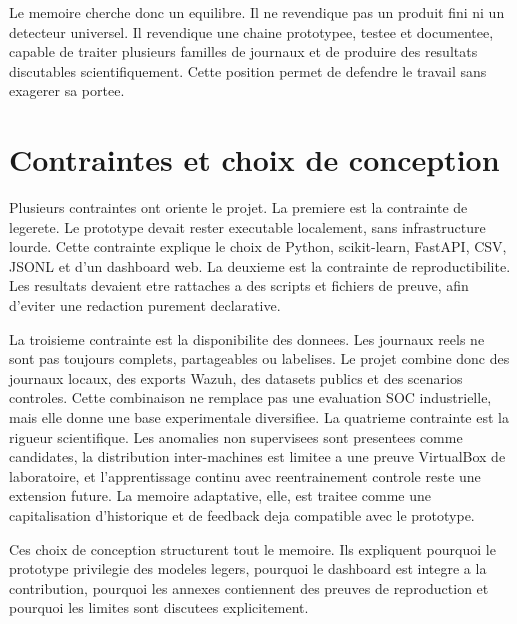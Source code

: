 Le memoire cherche donc un equilibre. Il ne revendique pas un produit fini ni un detecteur universel. Il revendique une chaine prototypee, testee et documentee, capable de traiter plusieurs familles de journaux et de produire des resultats discutables scientifiquement. Cette position permet de defendre le travail sans exagerer sa portee.

\section{Contraintes et choix de conception}
Plusieurs contraintes ont oriente le projet. La premiere est la contrainte de legerete. Le prototype devait rester executable localement, sans infrastructure lourde. Cette contrainte explique le choix de Python, scikit-learn, FastAPI, CSV, JSONL et d'un dashboard web. La deuxieme est la contrainte de reproductibilite. Les resultats devaient etre rattaches a des scripts et fichiers de preuve, afin d'eviter une redaction purement declarative.

La troisieme contrainte est la disponibilite des donnees. Les journaux reels ne sont pas toujours complets, partageables ou labelises. Le projet combine donc des journaux locaux, des exports Wazuh, des datasets publics et des scenarios controles. Cette combinaison ne remplace pas une evaluation SOC industrielle, mais elle donne une base experimentale diversifiee. La quatrieme contrainte est la rigueur scientifique. Les anomalies non supervisees sont presentees comme candidates, la distribution inter-machines est limitee a une preuve VirtualBox de laboratoire, et l'apprentissage continu avec reentrainement controle reste une extension future. La memoire adaptative, elle, est traitee comme une capitalisation d'historique et de feedback deja compatible avec le prototype.

Ces choix de conception structurent tout le memoire. Ils expliquent pourquoi le prototype privilegie des modeles legers, pourquoi le dashboard est integre a la contribution, pourquoi les annexes contiennent des preuves de reproduction et pourquoi les limites sont discutees explicitement.

